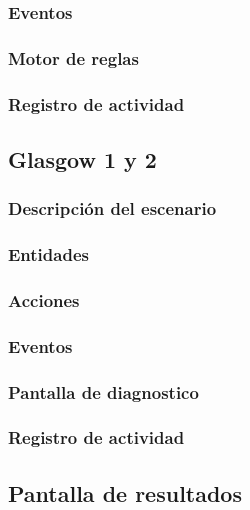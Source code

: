     \subsubsection{Eventos} %
    \subsubsection{Motor de reglas} %
    \subsubsection{Registro de actividad} %


\subsection{Glasgow 1 y 2}
    \subsubsection{Descripción del escenario}
    \subsubsection{Entidades} %
    \subsubsection{Acciones} %
    \subsubsection{Eventos} %
    \subsubsection{Pantalla de diagnostico}
    \subsubsection{Registro de actividad} %
    
\subsection{Pantalla de resultados}
